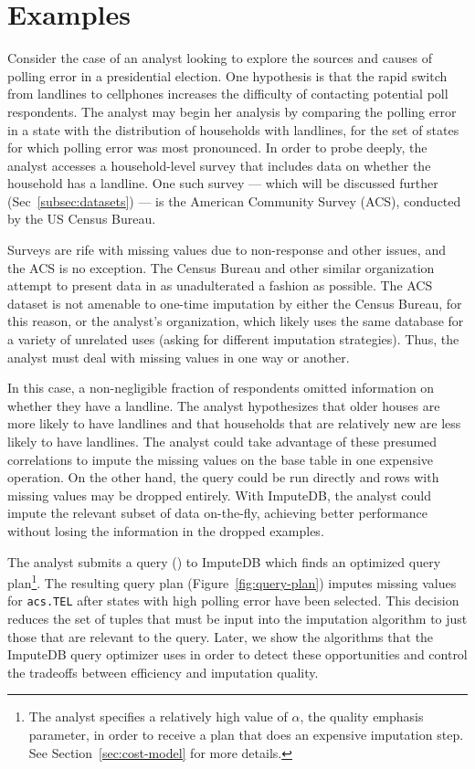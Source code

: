 \section{Examples}

Consider the case of an analyst looking to explore the sources and causes of
polling error in a presidential election. One hypothesis \cite{zukin2015s}
is that the rapid switch from landlines to cellphones increases the
difficulty of contacting potential poll respondents. The analyst may
begin her analysis by comparing the polling error in a state with the
distribution of households with landlines, for the set of states for which
polling error was most pronounced. In order to probe deeply, the analyst
accesses a household-level survey that includes data on
whether the household has a landline. One such survey --- which will be
discussed further (Sec~\ref{subsec:datasets}) --- is the American Community Survey (ACS),
conducted by the US Census Bureau.

Surveys are rife with missing values due to non-response and other issues, and
the ACS is no exception. The Census Bureau and other similar organization attempt to present
data in as unadulterated a fashion as possible. The ACS dataset is not amenable to one-time
imputation by either the Census Bureau, for this reason, or the analyst's organization,
which likely uses the same database for a variety of unrelated uses (asking for different
imputation strategies). Thus, the analyst must deal with missing values in one way or
another.

In this case, a non-negligible fraction of respondents omitted information on whether they
have a landline. The analyst hypothesizes that older houses are more likely to have
landlines and that households that are relatively new are less likely to have landlines. 
The analyst could take advantage of these presumed correlations to impute the missing values
on the base table in one expensive operation. On the other hand, the query could be run
directly and rows with missing values may be dropped entirely. With ImputeDB, the analyst
could impute the relevant subset of data on-the-fly, achieving better performance without
losing the information in the dropped examples.

The analyst submits a query () to ImputeDB which finds an optimized query
plan\footnote{The analyst specifies a relatively high value of $\alpha$, the quality
emphasis parameter, in order to receive a plan that does an expensive imputation step. See
Section~\ref{sec:cost-model} for more details.}. The resulting query plan
(Figure~\ref{fig:query-plan})
imputes missing values for \verb!acs.TEL! after states with high polling error have been
selected. This decision reduces the set of tuples that must be input into the imputation
algorithm to just those that are relevant to the query. Later, we show the algorithms that
the ImputeDB query optimizer uses in order to detect these opportunities and control the
tradeoffs between efficiency and imputation quality.

